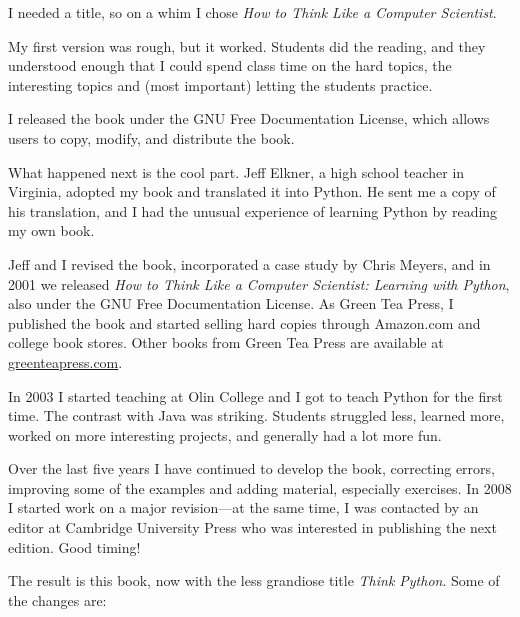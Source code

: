 \documentclass[10pt]{book}
\begin{document}
I needed a title, so on a whim I chose {\em How to Think Like
a Computer Scientist}.

My first version was rough, but it worked.  Students did the reading,
and they understood enough that I could spend class time on the hard
topics, the interesting topics and (most important) letting the
students practice.

I released the book under the GNU Free Documentation License,
which allows users to copy, modify, and distribute the book.


What happened next is the cool part.  Jeff Elkner, a high school
teacher in Virginia, adopted my book and translated it into
Python.  He sent me a copy of his translation, and I had the
unusual experience of learning Python by reading my own book.

Jeff and I revised the book, incorporated a case study by
Chris Meyers, and in 2001 we released {\em How to Think Like
a Computer Scientist: Learning with Python}, also under
the GNU Free Documentation License.
As Green Tea Press, I published the book and started selling
hard copies through Amazon.com and college book stores.
Other books from Green Tea Press are available at
\url{greenteapress.com}.

In 2003 I started teaching at Olin College and I got to teach
Python for the first time.  The contrast with Java was striking.
Students struggled less, learned more, worked on more interesting
projects, and generally had a lot more fun.

Over the last five years I have continued to develop the book,
correcting errors, improving some of the examples and
adding material, especially exercises.  In 2008 I started work
on a major revision---at the same time, I was
contacted by an editor at Cambridge University Press who
was interested in publishing the next edition.  Good timing!

The result is this book, now with the less grandiose title
{\em Think Python}.  Some of the changes are:
\end{document}
